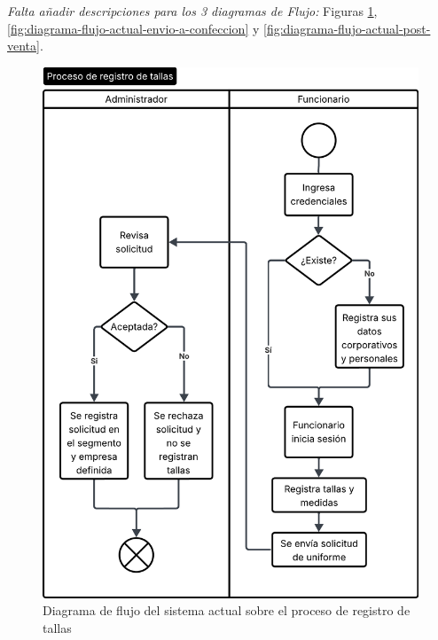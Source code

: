 \textit{Falta añadir descripciones para los 3 diagramas de Flujo:} Figuras \ref{fig:diagrama-flujo-actual-registro-de-tallas}, \ref{fig:diagrama-flujo-actual-envio-a-confeccion} y \ref{fig:diagrama-flujo-actual-post-venta}.

\begin{figure}[htbp]
    \centering
    \includegraphics[height=0.9\textheight]{figuras/diagramas-actuales/diagrama-flujo-actual-registro-de-tallas.png}
    \caption{Diagrama de flujo del sistema actual sobre el proceso de registro de tallas}
    \label{fig:diagrama-flujo-actual-registro-de-tallas}
\end{figure}

